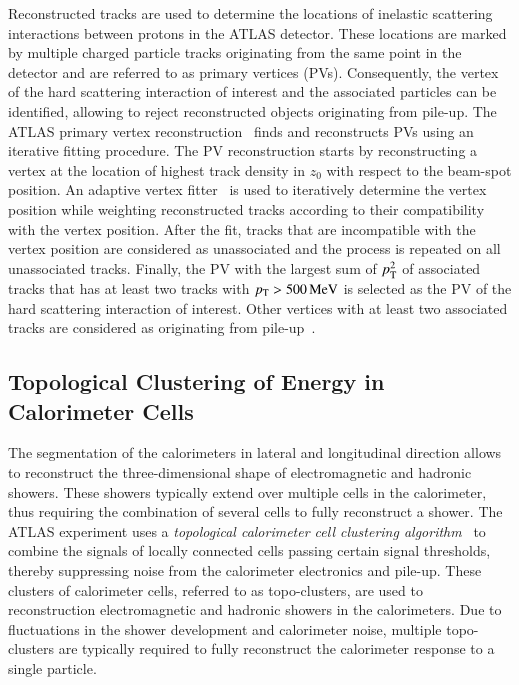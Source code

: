 Reconstructed tracks are used to determine the locations of inelastic scattering
interactions between protons in the ATLAS detector. These locations are marked
by multiple charged particle tracks originating from the same point in the
detector and are referred to as primary vertices (PVs). Consequently, the vertex
of the hard scattering interaction of interest and the associated particles can
be identified, allowing to reject reconstructed objects originating from
pile-up. The ATLAS primary vertex reconstruction~\cite{PERF-2015-01} finds and
reconstructs PVs using an iterative fitting procedure. The PV reconstruction
starts by reconstructing a vertex at the location of highest track density in
$z_0$ with respect to the beam-spot position. An adaptive vertex
fitter~\cite{Fruhwirth:2007hz} is used to iteratively determine the vertex
position while weighting reconstructed tracks according to their compatibility
with the vertex position. After the fit, tracks that are incompatible with the
vertex position are considered as unassociated and the process is repeated on
all unassociated tracks. Finally, the PV with the largest sum of $p_{\text{T}}^2$ of
associated tracks that has at least two tracks with $p_{\text{T}} > \SI{500}{\ensuremath{\text{MeV}}}$ is
selected as the PV of the hard scattering interaction of interest. Other
vertices with at least two associated tracks are considered as originating from
pile-up~\cite{PERF-2015-01}.


\subsection{Topological Clustering of Energy in Calorimeter Cells}

The segmentation of the calorimeters in lateral and longitudinal direction
allows to reconstruct the three-dimensional shape of electromagnetic and
hadronic showers. These showers typically extend over multiple cells in the
calorimeter, thus requiring the combination of several cells to fully
reconstruct a shower. The ATLAS experiment uses a \emph{topological calorimeter
  cell clustering algorithm}~\cite{PERF-2014-07} to combine the signals of
locally connected cells passing certain signal thresholds, thereby suppressing
noise from the calorimeter electronics and pile-up. These clusters of
calorimeter cells, referred to as topo-clusters, are used to reconstruction
electromagnetic and hadronic showers in the calorimeters. Due to fluctuations in
the shower development and calorimeter noise, multiple topo-clusters are
typically required to fully reconstruct the calorimeter response to a single
particle.

